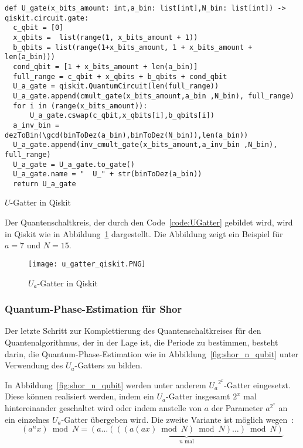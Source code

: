 \begin{listing}[H]
\begin{verbatim}  
def U_gate(x_bits_amount: int,a_bin: list[int],N_bin: list[int]) -> qiskit.circuit.gate:  
  c_qbit = [0]
  x_qbits =  list(range(1, x_bits_amount + 1))
  b_qbits = list(range(1+x_bits_amount, 1 + x_bits_amount + len(a_bin)))
  cond_qbit = [1 + x_bits_amount + len(a_bin)]
  full_range = c_qbit + x_qbits + b_qbits + cond_qbit
  U_a_gate = qiskit.QuantumCircuit(len(full_range))
  U_a_gate.append(cmult_gate(x_bits_amount,a_bin ,N_bin), full_range)
  for i in (range(x_bits_amount)):
      U_a_gate.cswap(c_qbit,x_qbits[i],b_qbits[i])
  a_inv_bin = dezToBin(\gcd(binToDez(a_bin),binToDez(N_bin)),len(a_bin))
  U_a_gate.append(inv_cmult_gate(x_bits_amount,a_inv_bin ,N_bin), full_range)
  U_a_gate = U_a_gate.to_gate()
  U_a_gate.name = "  U_" + str(binToDez(a_bin))
  return U_a_gate
  \end{verbatim}
  \caption{\(U\)-Gatter in Qiskit}
  \label{code:UGatter}
\end{listing}

Der Quantenschaltkreis, der durch den Code~\ref{code:UGatter} gebildet wird, 
wird in Qiskit wie in Abbildung~\ref{fig:u_gatter_qiskit} dargestellt. 
Die Abbildung zeigt ein Beispiel für \(a=7\) und \(N=15\).

\begin{figure}[H]
  \centering
  \texttt{[image: u\_gatter\_qiskit.PNG]}
  \caption{\(U_a\)-Gatter in Qiskit}
  \label{fig:u_gatter_qiskit}
\end{figure}

\subsubsection{Quantum-Phase-Estimation für Shor} \label{section:imp_QPE_Shor}
Der letzte Schritt zur Komplettierung des Quantenschaltkreises für den Quantenalgorithmus, 
der in der Lage ist, 
die Periode zu bestimmen, besteht darin, 
die Quantum-Phase-Estimation wie in Abbildung~\ref{fig:shor_n_qubit} unter Verwendung des \(U_a\)-Gatters zu bilden.

In Abbildung~\ref{fig:shor_n_qubit} werden unter anderem \({U_a}^{2^x}\)-Gatter eingesetzt.
Diese können realisiert werden, 
indem ein \({U_a}\)-Gatter insgesamt \(2^x\) mal hintereinander geschaltet wird oder 
indem anstelle von \(a\) der Parameter \(a^{2^x}\) an ein einzelnes \(U_a\)-Gatter übergeben wird.
Die zweite Variante ist möglich wegen~\cite{beauregard2003circuit}:
\[(a^nx)\bmod N = \underbrace{(a\dotsc(((a(ax)\bmod N)\bmod N)\dotsc)\bmod N)}_{\text{\(n\) mal}}\]

